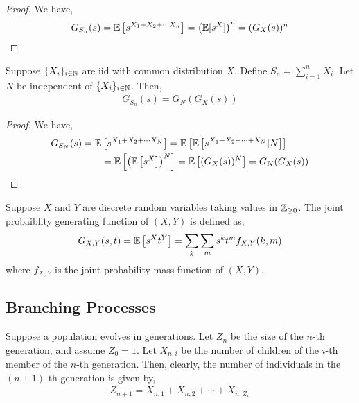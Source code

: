 \documentclass[12pt]{article}
\begin{document}
\begin{proof}
We have,
\begin{align*}
    G_{S_n}(s) = \mathbb{E} \left[ s^{X_1+X_2 + \cdots X_n} \right] = \left( \mathbb{E}[s^X] \right)^n = (G_X(s))^n
\end{align*}
\end{proof}

\begin{theorem}
Suppose \( \{X_i\}_{i\in\mathbb{N}} \) are iid with common distribution \( X \). Define \( S_n = \sum_{i=1}^{n} X_i \). Let \( N \) be independent of \( \{X_i\}_{i\in\mathbb{N}} \). Then,
\begin{align*}
    G_{S_n}(s) = G_N(G_X(s))
\end{align*}
\end{theorem}

\begin{proof}
We have,
\begin{align*}
    G_{S_N}(s) &= \mathbb{E} \left[ s^{X_1+X_2 + \cdots X_N} \right] = \mathbb{E} \left[ \mathbb{E} \left[ s^{X_1+X_2 +\cdots+X_N} | N \right] \right]
    \\ & \hspace{2em}= \mathbb{E} \left[ \left( \mathbb{E} \left[ s^X \right] \right)^N \right]
    = \mathbb{E} \left[ (G_X(s))^N \right]
    = G_N(G_X(s))
\end{align*}
\end{proof}

\begin{definition}
Suppose \( X \) and \( Y \) are discrete random variables taking values in \( \mathbb{Z}_{\geq 0} \). The joint probaiblity generating function of \( (X,Y) \) is defined as,
\begin{align*}
    G_{X,Y}(s,t) = \mathbb{E} \left[ s^Xt^Y \right] = \sum_k\sum_m s^kt^m f_{X,Y}(k,m)
\end{align*}
where \( f_{X,Y} \) is the joint probability mass function of \( (X,Y) \).
\end{definition}

\subsection{Branching Processes}
Suppose a population evolves in generations. Let \( Z_n \) be the size of the \( n \)-th generation, and assume \( Z_0 = 1 \). Let \( X_{n,i} \) be the number of children of the \( i \)-th member of the \( n \)-th generation. Then, clearly, the number of individuals in the \( (n+1) \)-th generation is given by,
\begin{align*}
    Z_{n+1} = X_{n,1} + X_{n,2} + \cdots + X_{n,Z_n}
\end{align*}
\end{document}
